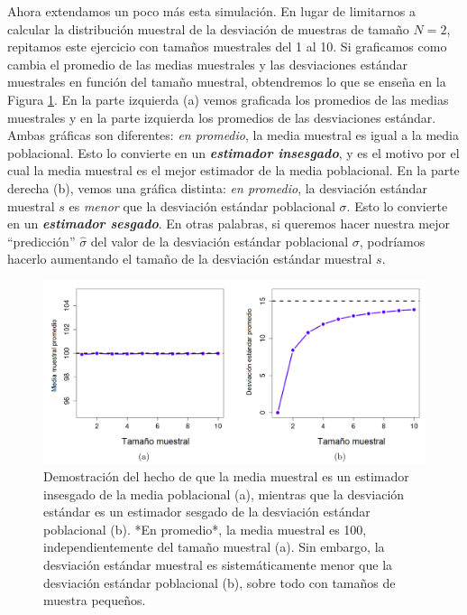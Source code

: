 \documentclass[spanish,]{book}
\begin{document}
Ahora extendamos un poco más esta simulación. En lugar de limitarnos a
calcular la distribución muestral de la desviación de muestras de tamaño
\(N=2\), repitamos este ejercicio con tamaños muestrales del 1 al 10. Si
graficamos como cambia el promedio de las medias muestrales y las
desviaciones estándar muestrales en función del tamaño muestral,
obtendremos lo que se enseña en la Figura \ref{fig:estimatorbias}. En la
parte izquierda (a) vemos graficada los promedios de las medias
muestrales y en la parte izquierda los promedios de las desviaciones
estándar. Ambas gráficas son diferentes: \emph{en promedio}, la media
muestral es igual a la media poblacional. Esto lo convierte en un
\textbf{\emph{estimador insesgado}}, y es el motivo por el cual la media
muestral es el mejor estimador de la media poblacional. En la parte
derecha (b), vemos una gráfica distinta: \emph{en promedio}, la
desviación estándar muestral \(s\) es \emph{menor} que la desviación
estándar poblacional \(\sigma\). Esto lo convierte en un
\textbf{\emph{estimador sesgado}}. En otras palabras, si queremos hacer
nuestra mejor ``predicción'' \(\hat\sigma\) del valor de la desviación
estándar poblacional \(\sigma\), podríamos hacerlo aumentando el tamaño
de la desviación estándar muestral \(s\).

\begin{figure}
\includegraphics[width=22.4in]{img/estimation/biasMeanSD} \caption{Demostración del hecho de que la media muestral es un estimador insesgado de la media poblacional (a), mientras que la desviación estándar es un estimador sesgado de la desviación estándar poblacional (b). *En promedio*, la media muestral es 100, independientemente del tamaño muestral (a). Sin embargo, la desviación estándar muestral es sistemáticamente menor que la desviación estándar poblacional (b), sobre todo con tamaños de muestra pequeños.}\label{fig:estimatorbias}
\end{figure}
\end{document}
